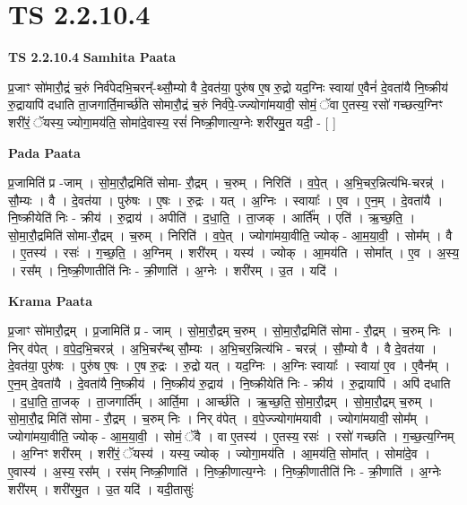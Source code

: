 \documentclass[17pt]{extarticle}
\begin{document}
\section*{ TS 2.2.10.4 }

\textbf{TS 2.2.10.4 } \newline
\textbf{Samhita Paata} \newline

प्र॒जाꣳ सो॑मारौ॒द्रं च॒रुं निर्व॑पेदभि॒चरन्᳚-थ्सौ॒म्यो वै दे॒वत॑या॒ पुरु॑ष ए॒ष रु॒द्रो यद॒ग्निः स्वाया॑ ए॒वैनं॑ दे॒वता॑यै नि॒ष्क्रीय॑ रु॒द्रायापि॑ दधाति ता॒जगार्ति॒मार्च्छ॑ति सोमारौ॒द्रं च॒रुं निर्व॑पे॒-ज्ज्योगा॑मयावी॒ सोमं॒ ॅवा ए॒तस्य॒ रसो॑ गच्छत्य॒ग्निꣳ शरी॑रं॒ ॅयस्य॒ ज्योगा॒मय॑ति॒ सोमा॑दे॒वास्य॒ रसं॑ निष्क्री॒णात्य॒ग्नेः शरी॑रमु॒त यदी॒ - [  ] \newline

\textbf{Pada Paata} \newline

प्र॒जामिति॑ प्र -जाम् । सो॒मा॒रौ॒द्रमिति॑ सोमा- रौ॒द्रम् । च॒रुम् । निरिति॑ । व॒पे॒त् । अ॒भि॒चर॒न्नित्य॑भि-चरन्न्॑ । सौ॒म्यः । वै । दे॒वत॑या । पुरु॑षः । ए॒षः । रु॒द्रः । यत् । अ॒ग्निः । स्वायाः᳚ । ए॒व । ए॒न॒म् । दे॒वता॑यै । नि॒ष्क्रीयेति॑ निः - क्रीय॑ । रु॒द्राय॑ । अपीति॑ । द॒धा॒ति॒ । ता॒जक् । आर्ति᳚म् । एति॑ । ऋ॒च्छ॒ति॒ । सो॒मा॒रौ॒द्रमिति॑ सोमा-रौ॒द्रम् । च॒रुम् । निरिति॑ । व॒पे॒त् । ज्योगा॑मया॒वीति॒ ज्योक् - आ॒म॒या॒वी॒ । सोम᳚म् । वै । ए॒तस्य॑ । रसः॑ । ग॒च्छ॒ति॒ । अ॒ग्निम् । शरी॑रम् । यस्य॑ । ज्योक् । आ॒मय॑ति । सोमा᳚त् । ए॒व । अ॒स्य॒ । रस᳚म् । नि॒ष्क्री॒णातीति॑ निः - क्री॒णाति॑ । अ॒ग्नेः । शरी॑रम् । उ॒त । यदि॑ ।  \newline


\textbf{Krama Paata} \newline

प्र॒जाꣳ सो॑मारौ॒द्रम् । प्र॒जामिति॑ प्र - जाम् । सो॒मा॒रौ॒द्रम् च॒रुम् । सो॒मा॒रौ॒द्रमिति॑ सोमा - रौ॒द्रम् । च॒रुम् निः । निर् व॑पेत् । व॒पे॒द॒भि॒चरन्न्॑ । अ॒भि॒चर᳚न्थ् सौ॒म्यः । अ॒भि॒चर॒न्नित्य॑भि - चरन्न्॑ । सौ॒म्यो वै । वै दे॒वत॑या । दे॒वत॑या॒ पुरु॑षः । पुरु॑ष ए॒षः । ए॒ष रु॒द्रः । रु॒द्रो यत् । यद॒ग्निः । अ॒ग्निः स्वायाः᳚ । स्वाया॑ ए॒व । ए॒वैन᳚म् । ए॒न॒म् दे॒वता॑यै । दे॒वता॑यै नि॒ष्क्रीय॑ । नि॒ष्क्रीय॑ रु॒द्राय॑ । नि॒ष्क्रीयेति॑ निः - क्रीय॑ । रु॒द्रायापि॑ । अपि॑ दधाति । द॒धा॒ति॒ ता॒जक् । ता॒जगार्ति᳚म् । आर्ति॒मा । आर्च्छ॑ति । ऋ॒च्छ॒ति॒ सो॒मा॒रौ॒द्रम् । सो॒मा॒रौ॒द्रम् च॒रुम् । सो॒मा॒रौ॒द्र मिति॑ सोमा - रौ॒द्रम् । च॒रुम् निः । निर् व॑पेत् । व॒पे॒ज्ज्योगा॑मयावी । ज्योगा॑मयावी॒ सोम᳚म् । ज्योगा॑मया॒वीति॒ ज्योक् - आ॒म॒या॒वी॒ । सोमं॒ ॅवै । वा ए॒तस्य॑ । ए॒तस्य॒ रसः॑ । रसो॑ गच्छति । ग॒च्छ॒त्य॒ग्निम् । अ॒ग्निꣳ शरी॑रम् । शरी॑रं॒ ॅयस्य॑ । यस्य॒ ज्योक् । ज्योगा॒मय॑ति । आ॒मय॑ति॒ सोमा᳚त् । सोमा॑दे॒व । ए॒वास्य॑ । अ॒स्य॒ रस᳚म् । रस॑म् निष्क्री॒णाति॑ । नि॒ष्क्री॒णात्य॒ग्नेः । नि॒ष्क्री॒णातीति॑ निः - क्री॒णाति॑ । अ॒ग्नेः शरी॑रम् । शरी॑रमु॒त । उ॒त यदि॑ । यदी॒तासुः॑ \newline
\end{document}
